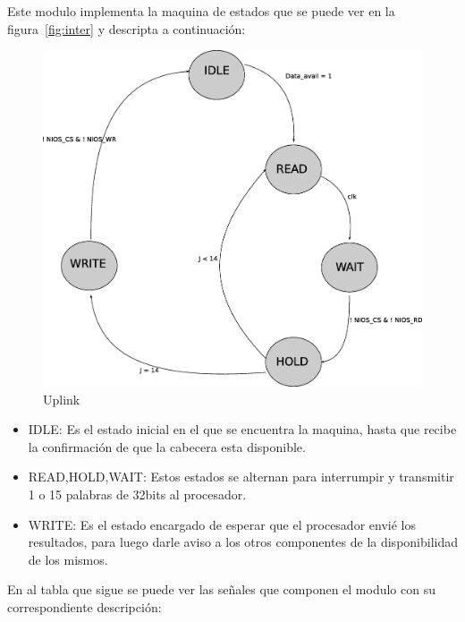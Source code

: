 Este modulo implementa la maquina de estados que se puede ver en la figura~\ref{fig:inter} y descripta a continuación:

\begin{figure}[H]
  \centering
	\includegraphics[scale=0.45]{3-arquitectura/graf/estuplinkcompleto.eps}
  \caption{Uplink}
  \label{fig:estuplink}
\end{figure}

\begin{itemize}
	\item IDLE: Es el estado inicial en el que se encuentra la maquina, hasta que recibe la confirmación de que la cabecera esta disponible.
	\item READ,HOLD,WAIT: Estos estados se alternan para interrumpir y transmitir 1 o 15 palabras de 32bits al procesador.
	\item WRITE: Es el estado encargado de esperar que el procesador envié los resultados, para luego darle aviso a los otros componentes de la disponibilidad de los mismos.
\end{itemize}

En al tabla que sigue se puede ver las señales que componen el modulo con su correspondiente descripción:

